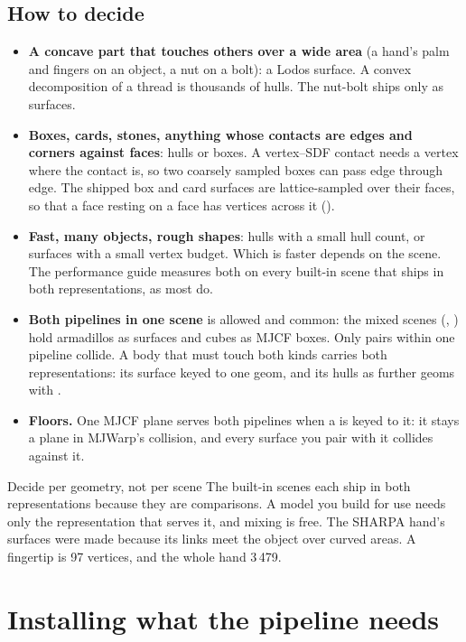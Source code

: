 \subsection{How to decide}\label{sec:howdecide}

\begin{itemize}
\item \textbf{A concave part that touches others over a wide area} (a hand's palm and fingers on an object, a nut on a bolt): a Lodos surface. A convex decomposition of a thread is thousands of hulls. The nut-bolt ships only as surfaces.
\item \textbf{Boxes, cards, stones, anything whose contacts are edges and corners against faces}: hulls or boxes. A vertex--SDF contact needs a vertex where the contact is, so two coarsely sampled boxes can pass edge through edge. The shipped box and card surfaces are lattice-sampled over their faces, so that a face resting on a face has vertices across it ().
\item \textbf{Fast, many objects, rough shapes}: hulls with a small hull count, or surfaces with a small vertex budget. Which is faster depends on the scene. The performance guide measures both on every built-in scene that ships in both representations, as most do.
\item \textbf{Both pipelines in one scene} is allowed and common: the mixed scenes (, ) hold armadillos as surfaces and cubes as MJCF boxes. Only pairs within one pipeline collide. A body that must touch both kinds carries both representations: its surface keyed to one geom, and its hulls as further geoms with .
\item \textbf{Floors.} One MJCF plane serves both pipelines when a  is keyed to it: it stays a plane in MJWarp's collision, and every surface you pair with it collides against it.
\end{itemize}

\begin{notebox}{Decide per geometry, not per scene}
The built-in scenes each ship in both representations because they are comparisons. A model you build for use needs only the representation that serves it, and mixing is free. The SHARPA hand's surfaces were made because its links meet the object over curved areas. A fingertip is 97 vertices, and the whole hand 3\,479.
\end{notebox}

\section{Installing what the pipeline needs}\label{sec:install}


